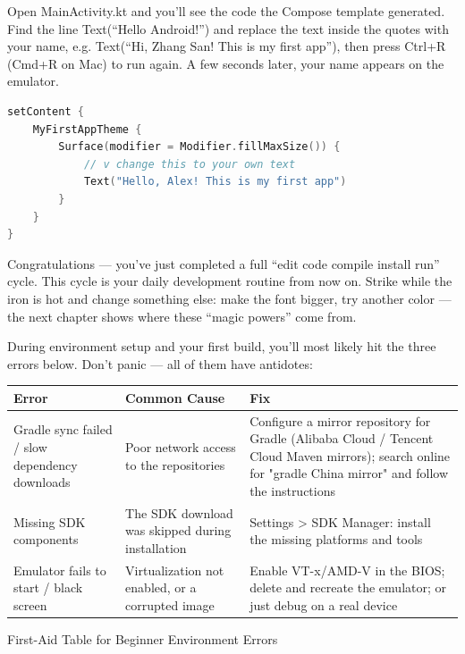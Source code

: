 
Open MainActivity.kt and you'll see the code the Compose template generated. Find the line Text(“Hello Android!”) and replace the text inside the quotes with your name, e.g. Text(“Hi, Zhang San! This is my first app”), then press Ctrl+R (Cmd+R on Mac) to run again. A few seconds later, your name appears on the emulator.

\begin{lstlisting}[language=Kotlin]
setContent {
    MyFirstAppTheme {
        Surface(modifier = Modifier.fillMaxSize()) {
            // v change this to your own text
            Text("Hello, Alex! This is my first app")
        }
    }
}
\end{lstlisting}

Congratulations — you've just completed a full “edit code compile install run” cycle. This cycle is your daily development routine from now on. Strike while the iron is hot and change something else: make the font bigger, try another color — the next chapter shows where these “magic powers” come from.


During environment setup and your first build, you'll most likely hit the three errors below. Don't panic — all of them have antidotes:

\begin{center}
\begin{tabularx}{\linewidth}{|X|X|X|}
\hline
\textbf{Error} & \textbf{Common Cause} & \textbf{Fix} \tabularnewline
\hline
Gradle sync failed / slow dependency downloads & Poor network access to the repositories & Configure a mirror repository for Gradle (Alibaba Cloud / Tencent Cloud Maven mirrors); search online for "gradle China mirror" and follow the instructions \tabularnewline
Missing SDK components & The SDK download was skipped during installation & Settings > SDK Manager: install the missing platforms and tools \tabularnewline
Emulator fails to start / black screen & Virtualization not enabled, or a corrupted image & Enable VT-x/AMD-V in the BIOS; delete and recreate the emulator; or just debug on a real device \tabularnewline
\hline
\end{tabularx}
\end{center}

\begin{center}\small\color{gray}First-Aid Table for Beginner Environment Errors\end{center}

